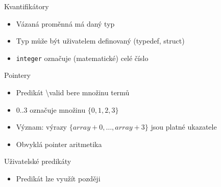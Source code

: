 \documentclass[11pt]{beamer}
\begin{document}


\begin{frame}{Kvantifikátory}
\lstQuantifiedAssert
\begin{itemize}
	\item Vázaná proměnná má daný typ
	\item Typ může být uživatelem definovaný (typedef, struct)
	\item \texttt{integer} označuje (matematické) celé číslo
\end{itemize}
\end{frame}




\begin{frame}{Pointery}
\lstPointerValidity
\begin{itemize}
	\item Predikát \textbackslash valid bere množinu termů
	\item \(0..3\) označuje množinu \( \{ 0, 1, 2, 3 \} \)
	\item Význam: výrazy \( \{ array + 0, \ldots , array + 3 \} \) jsou platné ukazatele
	\item Obvyklá pointer aritmetika
\end{itemize}
\end{frame}



\begin{frame}{Uživatelské predikáty}
\lstPredicateSorted
\begin{itemize}
\item Predikát lze využít později
\end{itemize}
\lstPredicateSortedUsed
\end{frame}
\end{document}

